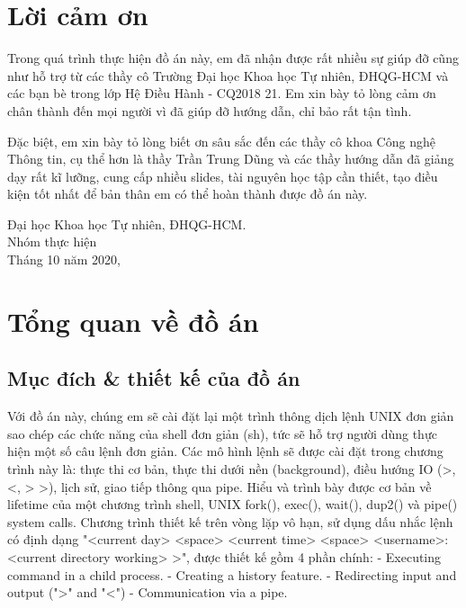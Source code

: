 \documentclass{article}
\begin{document}
\section*{Lời cảm ơn}
\vspace{1.0in}
\begingroup
\setlength{\parindent}{0pt}
Trong quá trình thực hiện đồ án này, em đã nhận được rất nhiều sự giúp đỡ cũng như hỗ trợ từ các thầy cô Trường Đại học Khoa học Tự nhiên, ĐHQG-HCM và các bạn bè trong lớp Hệ Điều Hành - CQ2018 21. Em xin bày tỏ lòng cảm ơn chân thành đến mọi người vì đã giúp đỡ hướng dẫn, chỉ bảo rất tận tình.

Đặc biệt, em xin bày tỏ lòng biết ơn sâu sắc đến các thầy cô khoa Công nghệ Thông tin, cụ thể hơn là thầy Trần Trung Dũng và các thầy hướng dẫn đã giảng dạy rất kĩ lưỡng, cung cấp nhiều slides, tài nguyên học tập cần thiết, tạo điều kiện tốt nhất để bản thân em có thể hoàn thành được đồ án này.

\par


{Đại học Khoa học Tự nhiên, ĐHQG-HCM.}\\
Nhóm thực hiện\\
Tháng 10 năm 2020,\\
\endgroup
\newpage
\tableofcontents
\newpage
{} %

\section{Tổng quan về đồ án}

\subsection{Mục đích & thiết kế của đồ án}

Với đồ án này, chúng em sẽ cài đặt lại một trình thông dịch lệnh UNIX đơn giản sao chép các chức năng của shell đơn giản (sh), tức sẽ hỗ trợ người dùng thực hiện một số câu lệnh đơn giản.\newline
Các mô hình lệnh sẽ được cài đặt trong chương trình này là: thực thi cơ bản, thực thi dưới nền (background), điều hướng IO (>, <, > >), lịch sử, giao tiếp thông qua pipe. \newline
Hiểu và trình bày được cơ bản về lifetime của một chương trình shell, UNIX fork(), exec(), wait(), dup2() và pipe() system calls.\newline
Chương trình thiết kế trên vòng lặp vô hạn, sử dụng dấu nhắc lệnh có định dạng "<current day> <space> <current time> <space> <username>:<current directory working> >", được thiết kế gồm 4 phần chính:
-	Executing command in a child process.
-	Creating a history feature.
-	Redirecting input and output (">" and  "<")
-	Communication via a pipe.
\end{document}
